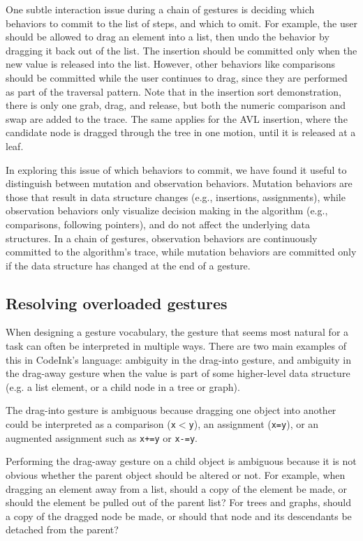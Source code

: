 One subtle interaction issue during a chain of gestures is deciding which
behaviors to commit to the list of steps, and which to omit. For example, the
user should be allowed to drag an element into a list, then undo the behavior by
dragging it back out of the list. The insertion should be committed only when
the new value is released into the list. However, other behaviors like
comparisons should be committed while the user continues to drag, since they are
performed as part of the traversal pattern. Note that in the insertion sort
demonstration, there is only one grab, drag, and release, but both the
numeric comparison and swap are added to the trace. The same applies for
the AVL insertion, where the candidate node is dragged
through the tree in one motion, until it is released at a leaf.

In exploring this issue of which behaviors to commit, we have found it useful to
distinguish between mutation and observation behaviors. Mutation behaviors are
those that result in data structure changes (e.g., insertions, assignments), while
observation behaviors only visualize decision making in the algorithm
(e.g., comparisons, following pointers), and do not affect the underlying data
structures. In a chain of gestures, observation behaviors are continuously
committed to the algorithm's trace, while mutation behaviors are committed
only if the data structure has changed at the end of a gesture.

\subsection{Resolving overloaded gestures}
\label{sec:overloaded-gestures}

When designing a gesture vocabulary, the gesture that seems most natural for a
task can often be interpreted in multiple ways. There are two main examples of
this in CodeInk's language: ambiguity in the drag-into gesture, and ambiguity in
the drag-away gesture when the value is part of some higher-level data structure
(e.g. a list element, or a child node in a tree or graph).

The drag-into gesture is ambiguous because dragging one object into
another could be interpreted as a comparison (\texttt{x$<$y}), an
assignment (\texttt{x=y}), or an augmented assignment such as
\texttt{x+=y} or \texttt{x-=y}.

Performing the drag-away gesture on a child object is ambiguous because it is
not obvious whether the parent object should be altered or not. For example,
when dragging an element away from a list, should a copy of the element be made,
or should the element be pulled out of the parent list? For trees and graphs,
should a copy of the dragged node be made, or should that node and its
descendants be detached from the parent?

